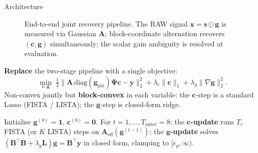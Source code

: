 \documentclass[final]{beamer}
\newlength{\colwidth}
\begin{document}
\begin{frame}[t]
\begin{columns}[t]
\begin{column}{\colwidth}
\begin{block}{Architecture}
\begin{figure}
          \caption{End-to-end joint recovery pipeline. The RAW signal
            $\boldsymbol{x}{=}\boldsymbol{s}\!\odot\!\boldsymbol{g}$ is measured via Gaussian
            $\boldsymbol{A}$; block-coordinate alternation recovers
            $(\boldsymbol{c},\boldsymbol{g})$ simultaneously; the scalar gain
          ambiguity is resolved at evaluation.}
        \end{figure}

        \textbf{Replace} the two-stage pipeline with a single objective:
        \[
          \min_{\boldsymbol{c},\boldsymbol{g}}\;
          \tfrac12\big\|\boldsymbol{A}\,\mathrm{diag}(\boldsymbol{g}_{\mathrm{pix}})
          \bm{\Psi}\boldsymbol{c}-\boldsymbol{y}\big\|_2^2
          +\lambda_c\|\boldsymbol{c}\|_1
          +\lambda_g\|\nabla\boldsymbol{g}\|_2^2.
        \]
        Non-convex jointly but \textbf{block-convex} in each variable:
        the $\boldsymbol{c}$-step is a standard Lasso (FISTA / LISTA);
        the $\boldsymbol{g}$-step is closed-form ridge.

        Initialise $\boldsymbol{g}^{(0)}{=}\boldsymbol{1}$,
        $\boldsymbol{c}^{(0)}{=}\boldsymbol{0}$. For
        $t{=}1,\dots,T_{\mathrm{outer}}{=}8$: the
        \textbf{$\boldsymbol{c}$-update} runs $T_c$ FISTA (or $K$ LISTA)
        steps on
        $\boldsymbol{A}_{\!\mathrm{eff}}(\boldsymbol{g}^{(t-1)})$; the
        \textbf{$\boldsymbol{g}$-update} solves
        $(\boldsymbol{B}^{\!\top}\!\boldsymbol{B}{+}\lambda_g\boldsymbol{L})\boldsymbol{g}{=}\boldsymbol{B}^{\!\top}\!\boldsymbol{y}$
        in closed form, clamping to $[\epsilon_g,\infty)$.


\end{block}
\end{column}
\end{columns}
\end{frame}
\end{document}
